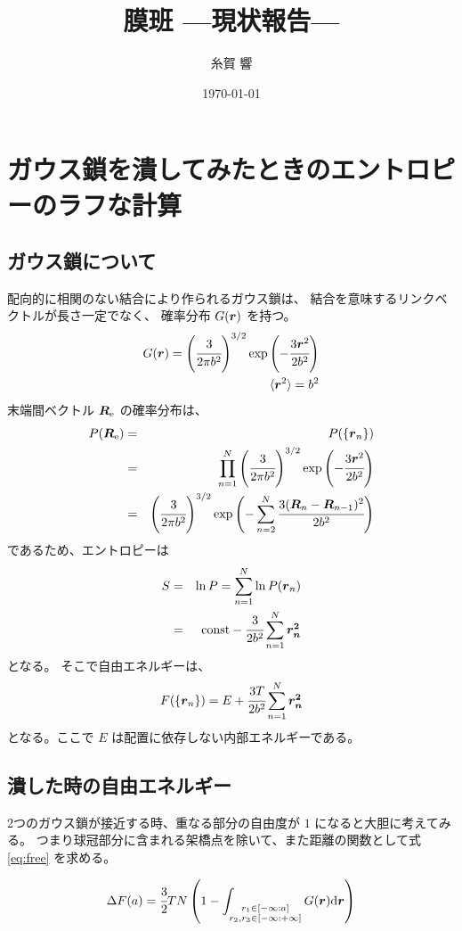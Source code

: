 \documentclass[a4j,12pt]{jarticle}
\title{\Large{膜班 —現状報告—}\\
\large{}}
\author{糸賀 響}
\date{\today}
\def\vector#1{\mbox{\boldmath $#1$}}
\begin{document}
\maketitle \thispagestyle{empty}
\section{ガウス鎖を潰してみたときのエントロピーのラフな計算}
\subsection{ガウス鎖について}
配向的に相関のない結合により作られるガウス鎖は、
結合を意味するリンクベクトルが長さ一定でなく、
確率分布 $G(\vector{r})$ を持つ。
\begin{eqnarray}
   G(\vector{r}) = 
   \left(\cfrac{3}{2\pi b^2}\right)^{3/2}{\rm exp}\left(-\cfrac{3\vector{r}^2}{2b^2}\right)\\
   \langle\vector{r}^2\rangle=b^2
\end{eqnarray}
末端間ベクトル $\vector{R}_{\rm e}$ の確率分布は、
\begin{eqnarray}
   P(\vector{R}_{\rm e})
   &=& P(\{\vector{r}_n\})\\
   &=& \prod_{n=1}^N\left(\cfrac{3}{2\pi b^2}\right)^{3/2}{\rm exp}\left(-\cfrac{3\vector{r}^2}{2b^2}\right)\\
   &=& \left(\cfrac{3}{2\pi b^2}\right)^{3/2}{\rm exp}\left(-\sum_{n=2}^N\cfrac{3(\vector{R}_{n}-\vector{R}_{n-1})^2}{2b^2}\right)
\end{eqnarray}
であるため、エントロピーは
\begin{eqnarray}
   S
   &=& \ln P = \sum_{n=1}^{N}\ln P(\vector{r}_n)\\
   &=& {\rm const} - \cfrac{3}{2b^2}\sum_{n=1}^N\vector{r_n^2}
\end{eqnarray}
となる。
そこで自由エネルギーは、
\begin{eqnarray}
   \label{eq:free}
   F(\{\vector{r}_n\}) = E + \cfrac{3T}{2b^2}\sum_{n=1}^N\vector{r_n^2}
\end{eqnarray}
となる。ここで $E$ は配置に依存しない内部エネルギーである。
\subsection{潰した時の自由エネルギー}
2つのガウス鎖が接近する時、重なる部分の自由度が $1$ になると大胆に考えてみる。
つまり球冠部分に含まれる架橋点を除いて、また距離の関数として式 \ref{eq:free} を求める。

\begin{eqnarray}
   \Delta F(a) = \cfrac{3}{2}TN\left(1-\int_{\substack{r_1\in [-\infty:a]\\r_2,r_3\in[-\infty:+\infty]}}G(\vector{r}){\rm d}\vector{r}\right)
\end{eqnarray}
\end{document}
